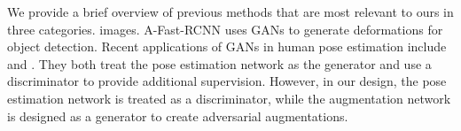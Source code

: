 \documentclass[10pt,twocolumn,letterpaper]{article}
\begin{document}
We provide a brief overview of previous methods that are most relevant to ours in three categories.%
images. A-Fast-RCNN \cite{wang2017fast} uses GANs to generate deformations for object detection. Recent applications of GANs in human pose estimation include \cite{yu2017adversarial} and \cite{chou2017self}. They both treat the pose estimation network as the generator and use a discriminator to provide additional supervision. However, in our design, the pose estimation network is treated as a discriminator, while the augmentation network is designed as a generator to create adversarial augmentations.
\end{document}
